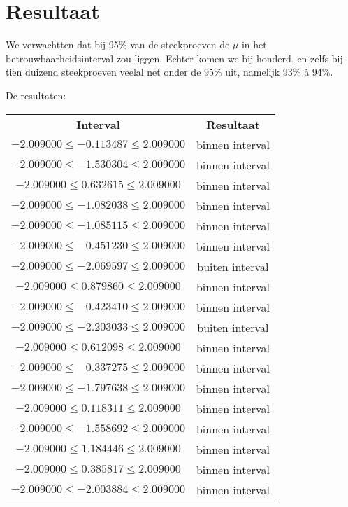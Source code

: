 \documentclass{article}
\begin{document}
\inputminted{python}{confidence.py}

\section{Resultaat}
We verwachtten dat bij 95\% van de steekproeven de $\mu$ in het
betrouwbaarheidsinterval zou liggen. Echter komen we bij honderd, en zelfs bij
tien duizend steekproeven veelal net onder de 95\% uit, namelijk 93\% à 94\%.

De resultaten:

\begin{longtabu}{cc}
    \textbf{Interval} & \textbf{Resultaat} \\
    $-2.009000 \leq -0.113487 \leq 2.009000$ & binnen interval \\
    $-2.009000 \leq -1.530304 \leq 2.009000$ & binnen interval \\
    $-2.009000 \leq 0.632615 \leq 2.009000$ & binnen interval \\
    $-2.009000 \leq -1.082038 \leq 2.009000$ & binnen interval \\
    $-2.009000 \leq -1.085115 \leq 2.009000$ & binnen interval \\
    $-2.009000 \leq -0.451230 \leq 2.009000$ & binnen interval \\
    $-2.009000 \leq -2.069597 \leq 2.009000$ & buiten interval \\
    $-2.009000 \leq 0.879860 \leq 2.009000$ & binnen interval \\
    $-2.009000 \leq -0.423410 \leq 2.009000$ & binnen interval \\
    $-2.009000 \leq -2.203033 \leq 2.009000$ & buiten interval \\
    $-2.009000 \leq 0.612098 \leq 2.009000$ & binnen interval \\
    $-2.009000 \leq -0.337275 \leq 2.009000$ & binnen interval \\
    $-2.009000 \leq -1.797638 \leq 2.009000$ & binnen interval \\
    $-2.009000 \leq 0.118311 \leq 2.009000$ & binnen interval \\
    $-2.009000 \leq -1.558692 \leq 2.009000$ & binnen interval \\
    $-2.009000 \leq 1.184446 \leq 2.009000$ & binnen interval \\
    $-2.009000 \leq 0.385817 \leq 2.009000$ & binnen interval \\
    $-2.009000 \leq -2.003884 \leq 2.009000$ & binnen interval \\

\end{longtabu}
\end{document}

